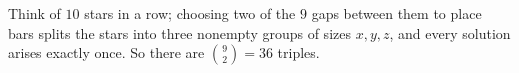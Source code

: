 Think of $10$ stars in a row; choosing two of the $9$ gaps between them to place bars splits the stars into three nonempty groups of sizes $x,y,z$, and every solution arises exactly once. So there are $\binom92=\boxed{36}$ triples.
